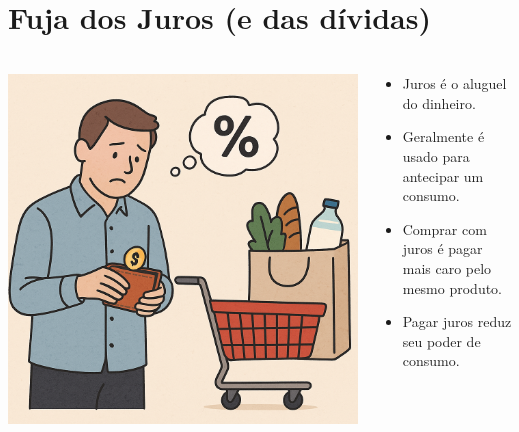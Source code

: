 \section{Fuja dos Juros (e das dívidas)} \label{FormProb}

\begin{frame}[c]
    \frametitle{}
    \begin{columns}
        \begin{column}{0.5\textwidth}
            \includegraphics[width=\textwidth]{../figuras/consumo2.png}
        \end{column}
        \begin{column}{0.5\textwidth}
            \centering
            \begin{itemize}
                \item Juros é o aluguel do dinheiro.
                \item Geralmente é usado para antecipar um consumo.
                \item Comprar com juros é pagar mais caro pelo mesmo produto.
                \item Pagar juros reduz seu poder de consumo.
            \end{itemize}
        \end{column}
    \end{columns}
\end{frame}

